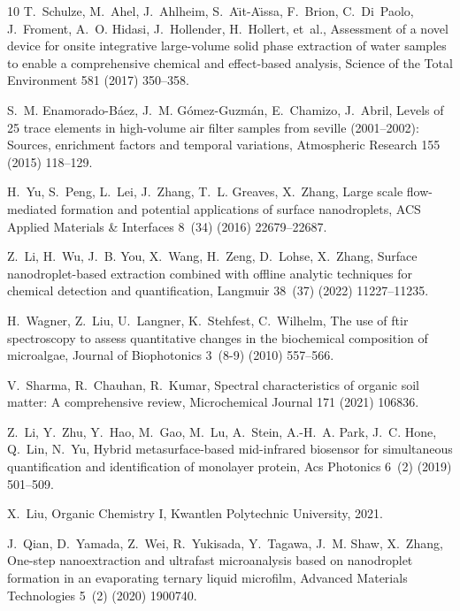 \documentclass[a4paper,fleqn]{cas-dc}
\begin{document}
\begin{sloppypar}
\begin{thebibliography}{10}
T.~Schulze, M.~Ahel, J.~Ahlheim, S.~A{\"\i}t-A{\"\i}ssa, F.~Brion, C.~Di~Paolo,
  J.~Froment, A.~O. Hidasi, J.~Hollender, H.~Hollert, et~al., Assessment of a
  novel device for onsite integrative large-volume solid phase extraction of
  water samples to enable a comprehensive chemical and effect-based analysis,
  Science of the Total Environment 581 (2017) 350--358.

S.~M. Enamorado-B{\'a}ez, J.~M. G{\'o}mez-Guzm{\'a}n, E.~Chamizo, J.~Abril,
  Levels of 25 trace elements in high-volume air filter samples from seville
  (2001--2002): Sources, enrichment factors and temporal variations,
  Atmospheric Research 155 (2015) 118--129.

H.~Yu, S.~Peng, L.~Lei, J.~Zhang, T.~L. Greaves, X.~Zhang, Large scale
  flow-mediated formation and potential applications of surface nanodroplets,
  ACS Applied Materials \& Interfaces 8~(34) (2016) 22679--22687.

Z.~Li, H.~Wu, J.~B. You, X.~Wang, H.~Zeng, D.~Lohse, X.~Zhang, Surface
  nanodroplet-based extraction combined with offline analytic techniques for
  chemical detection and quantification, Langmuir 38~(37) (2022) 11227--11235.

H.~Wagner, Z.~Liu, U.~Langner, K.~Stehfest, C.~Wilhelm, The use of ftir
  spectroscopy to assess quantitative changes in the biochemical composition of
  microalgae, Journal of Biophotonics 3~(8-9) (2010) 557--566.

V.~Sharma, R.~Chauhan, R.~Kumar, Spectral characteristics of organic soil
  matter: A comprehensive review, Microchemical Journal 171 (2021) 106836.

Z.~Li, Y.~Zhu, Y.~Hao, M.~Gao, M.~Lu, A.~Stein, A.-H.~A. Park, J.~C. Hone,
  Q.~Lin, N.~Yu, Hybrid metasurface-based mid-infrared biosensor for
  simultaneous quantification and identification of monolayer protein, Acs
  Photonics 6~(2) (2019) 501--509.

X.~Liu, Organic Chemistry I, Kwantlen Polytechnic University, 2021.

J.~Qian, D.~Yamada, Z.~Wei, R.~Yukisada, Y.~Tagawa, J.~M. Shaw, X.~Zhang,
  One-step nanoextraction and ultrafast microanalysis based on nanodroplet
  formation in an evaporating ternary liquid microfilm, Advanced Materials
  Technologies 5~(2) (2020) 1900740.


\end{thebibliography}
\end{sloppypar}
\end{document}
